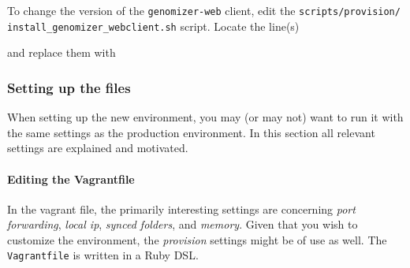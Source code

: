 \begin{Shaded}
\begin{Highlighting}[numbers=left,,]
 \KeywordTok{<}\KeywordTok{>}
\end{Highlighting}
\end{Shaded}

To change the version of the \texttt{genomizer-web} client, edit the
\texttt{scripts/provision/} \texttt{install\_genomizer\_webclient.sh}
script. Locate the line(s)

\begin{Shaded}
\begin{Highlighting}[numbers=left,,]
 
 
\end{Highlighting}
\end{Shaded}

and replace them with

\begin{Shaded}
\begin{Highlighting}[numbers=left,,]
 
 \KeywordTok{<}\KeywordTok{>}
\end{Highlighting}
\end{Shaded}

\subsubsection{Setting up the files}\label{setting-up-the-files}

When setting up the new environment, you may (or may not) want to run it
with the same settings as the production environment. In this section
all relevant settings are explained and motivated.

\paragraph{Editing the Vagrantfile}\label{editing-the-vagrantfile}

In the vagrant file, the primarily interesting settings are concerning
\emph{port forwarding}, \emph{local ip}, \emph{synced folders}, and
\emph{memory}. Given that you wish to customize the environment, the
\emph{provision} settings might be of use as well. The
\texttt{Vagrantfile} is written in a Ruby DSL.

